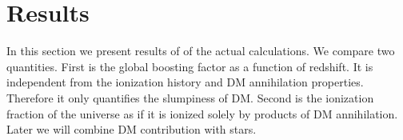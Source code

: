 \section{Results}
\label{sec:results}

In this section we present results of of the actual calculations. We compare two quantities. First is the global boosting factor as a function of redshift. It is independent from the ionization history and DM annihilation properties. Therefore it only quantifies the slumpiness of DM. Second is the ionization fraction of the universe as if it is ionized solely by products of DM annihilation. Later we will combine DM contribution with stars.